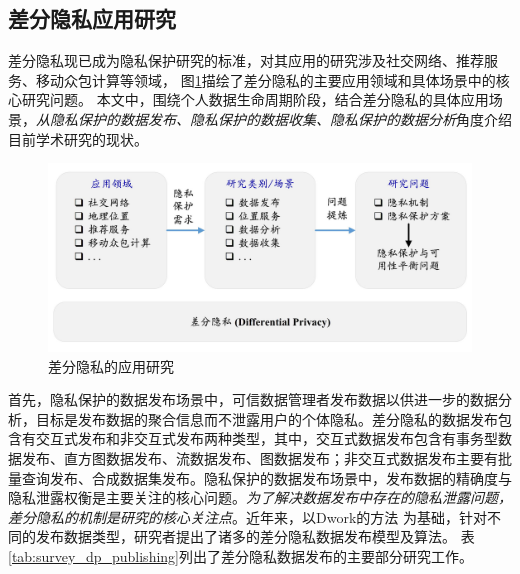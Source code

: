 \subsection{差分隐私应用研究}
差分隐私现已成为隐私保护研究的标准，对其应用的研究涉及社交网络\cite{wei2020asgldp,kasiviswanathan2013analyzing}、推荐服务\cite{xiao2020deep}、移动众包计算\cite{sei2017differential}等领域，%
图\ref{fig:chapter02-application-research}描绘了差分隐私的主要应用领域和具体场景中的核心研究问题。
本文中，围绕个人数据生命周期阶段，结合差分隐私的具体应用场景，{\em 从隐私保护的数据发布、隐私保护的数据收集、隐私保护的数据分析}角度介绍目前学术研究的现状。%
\begin{figure}[htbp]
	\centering
	\includegraphics[width = 0.85\linewidth]{./figures/chapter02_3.jpg}
	\caption{差分隐私的应用研究}
	\label{fig:chapter02-application-research}
\end{figure}

首先，隐私保护的数据发布场景中，可信数据管理者发布数据以供进一步的数据分析\cite{aggarwal2008privacy}，目标是发布数据的聚合信息而不泄露用户的个体隐私。差分隐私的数据发布包含有交互式发布和非交互式发布两种类型，其中，交互式数据发布包含有事务型数据发布、直方图数据发布、流数据发布、图数据发布；非交互式数据发布主要有批量查询发布、合成数据集发布\cite{zhu2017differentially}。隐私保护的数据发布场景中，发布数据的精确度与隐私泄露权衡是主要关注的核心问题。{\em 为了解决数据发布中存在的隐私泄露问题，差分隐私的机制是研究的核心关注点}。近年来，以Dwork的方法
\cite{dwork2006calibrating}为基础，针对不同的发布数据类型，研究者提出了诸多的差分隐私数据发布模型及算法。
表\ref{tab:survey_dp_publishing}列出了差分隐私数据发布的主要部分研究工作。





